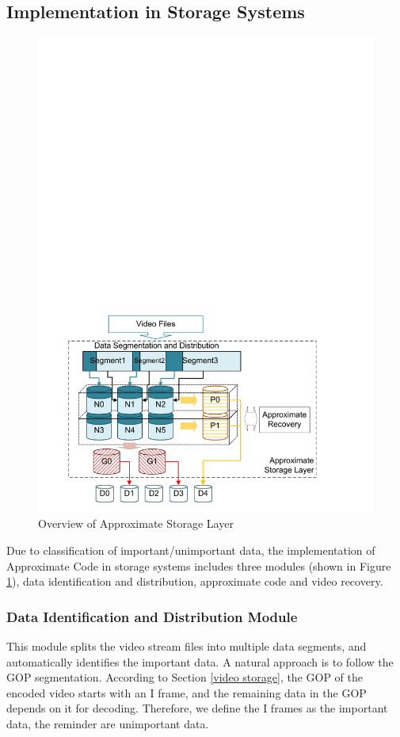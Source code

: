 \documentclass[sigconf]{acmart}
\begin{document}
\subsection{Implementation in Storage Systems}\label{Implementation}
\begin{figure}[htb]
\centering
\includegraphics[width=0.8\linewidth]{photo/implementation-V2.pdf}
\caption{Overview of Approximate Storage Layer}
\label{fig-implementation}
\end{figure}

Due to classification of important/unimportant data, the implementation of Approximate Code in storage systems includes three modules (shown in Figure \ref{fig-implementation}), data identification and distribution, approximate code and video recovery.

\subsubsection{Data Identification and Distribution Module}
This module splits the video stream files into multiple data segments, and automatically identifies the important data. A natural approach is to follow the GOP segmentation. According to Section \ref{video storage}, the GOP of the encoded video starts with an I frame, and the remaining data in the GOP depends on it for decoding. Therefore, we define the I frames as the important data, the reminder are unimportant data.
\end{document}
